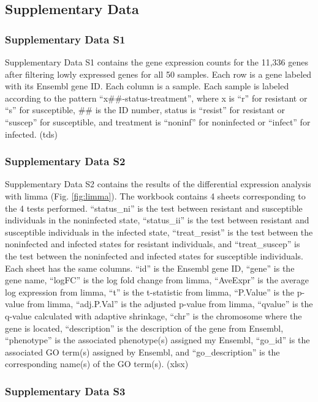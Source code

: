 \documentclass[fleqn,10pt]{wlscirep}
\begin{document}
\subsection*{Supplementary Data}

\subsubsection*{Supplementary Data S1}

Supplementary Data S1 contains the gene expression counts for the
11,336 genes after filtering lowly expressed genes for all 50 samples.
Each row is a gene labeled with its Ensembl gene ID. Each column is a
sample. Each sample is labeled according to the pattern
“x\#\#-status-treatment”, where x is “r” for resistant or “s” for
susceptible, \#\# is the ID number, status is “resist” for resistant
or “suscep” for susceptible, and treatment is “noninf” for noninfected
or “infect” for infected. (tds)
\subsubsection*{Supplementary Data S2}

Supplementary Data S2 contains the results of the differential
expression analysis with limma (Fig. \ref{fig:limma}). The workbook
contains 4 sheets corresponding to the 4 tests performed. “status\_ni”
is the test between resistant and susceptible individuals in the
noninfected state, “status\_ii” is the test between resistant and
susceptible individuals in the infected state, “treat\_resist” is the
test between the noninfected and infected states for resistant
individuals, and “treat\_suscep” is the test between the noninfected
and infected states for susceptible individuals. Each sheet has the
same columns. “id” is the Ensembl gene ID, “gene” is the gene name,
“logFC” is the log fold change from limma, “AveExpr” is the average
log expression from limma, “t” is the t-statistic from limma,
“P.Value” is the p-value from limma, “adj.P.Val” is the adjusted
p-value from limma, “qvalue” is the q-value calculated with adaptive
shrinkage, “chr” is the chromosome where the gene is located,
“description” is the description of the gene from Ensembl, “phenotype”
is the associated phenotype(s) assigned my Ensembl, “go\_id” is the
associated GO term(s) assigned by Ensembl, and “go\_description” is
the corresponding name(s) of the GO term(s). (xlsx)
\subsubsection*{Supplementary Data S3}
\end{document}
